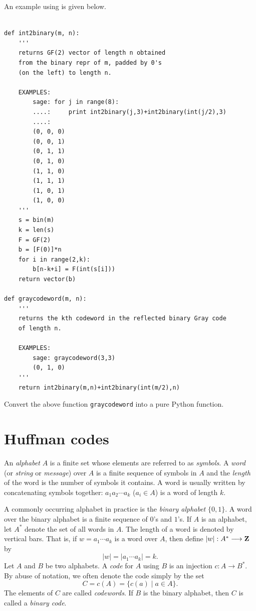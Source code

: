 An example using \sage is given below.

\begin{Verbatim}[fontsize=\scriptsize,fontfamily=courier,fontshape=tt,frame=single,label=\sage]

def int2binary(m, n):
    '''
    returns GF(2) vector of length n obtained
    from the binary repr of m, padded by 0's
    (on the left) to length n.

    EXAMPLES:
        sage: for j in range(8):
        ....:     print int2binary(j,3)+int2binary(int(j/2),3)
        ....:
        (0, 0, 0)
        (0, 0, 1)
        (0, 1, 1)
        (0, 1, 0)
        (1, 1, 0)
        (1, 1, 1)
        (1, 0, 1)
        (1, 0, 0)
    '''
    s = bin(m)
    k = len(s)
    F = GF(2)
    b = [F(0)]*n
    for i in range(2,k):
        b[n-k+i] = F(int(s[i]))
    return vector(b)

def graycodeword(m, n):
    '''
    returns the kth codeword in the reflected binary Gray code
    of length n.

    EXAMPLES:
        sage: graycodeword(3,3)
        (0, 1, 0)
    '''
    return int2binary(m,n)+int2binary(int(m/2),n)

\end{Verbatim}

\begin{exercise}
Convert the above function {\tt graycodeword} into a pure Python
function.
\end{exercise}



\section{Huffman codes}
\label{sec:trees_forests:Huffman_codes}

An \emph{alphabet} $A$ is a finite set whose elements
are referred to as \emph{symbols}. A \emph{word} (or
\emph{string} or \emph{message}) over $A$
is a finite sequence of symbols in $A$ and the \emph{length} of the
word is the number of symbols it contains. A word is usually written
by concatenating symbols together: $a_1 a_2 \cdots a_k$ ($a_i \in A$)
is a word of length $k$.

A commonly occurring alphabet in practice is the \emph{binary alphabet}
$\{0,1\}$. A word over the binary alphabet is a finite sequence of
$0$'s and $1$'s. If $A$ is an alphabet, let $A^*$ denote the set of
all words in $A$. The length of a word is denoted by vertical
bars. That is, if $w = a_1 \cdots a_k$ is a word over $A$, then define
$|w|: A^* \longrightarrow \mathbf{Z}$ by
\[
|w|
=
|a_1 \cdots a_k|
=
k.
\]
Let $A$ and $B$ be two alphabets. A \emph{code} for $A$
using $B$ is an injection $c: A \longrightarrow B^*$. By abuse of
notation, we often denote the code simply by the set
\[
C
=
c(A)
=
\{c(a) \;|\; a \in A\}.
\]
The elements of $C$ are called \emph{codewords}. If
$B$ is the binary alphabet, then $C$ is called a
\emph{binary code}.


